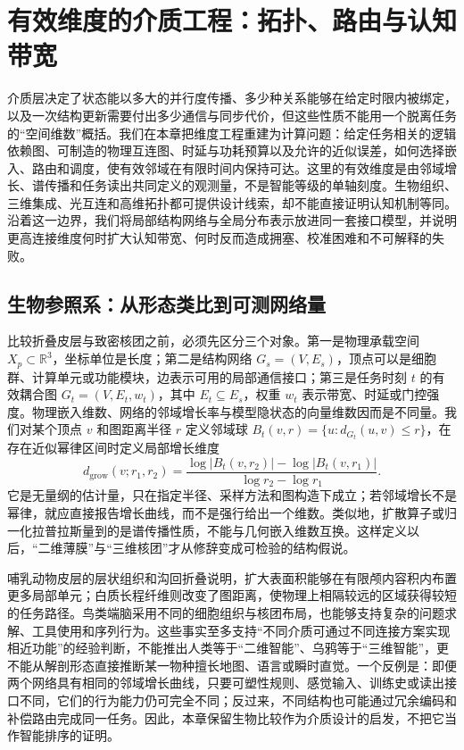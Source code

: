 \chapter{有效维度的介质工程：拓扑、路由与认知带宽}
\label{chp:medium_layer_ch_1}

介质层决定了状态能以多大的并行度传播、多少种关系能够在给定时限内被绑定，以及一次结构更新需要付出多少通信与同步代价，但这些性质不能用一个脱离任务的“空间维数”概括。我们在本章把维度工程重建为计算问题：给定任务相关的逻辑依赖图、可制造的物理互连图、时延与功耗预算以及允许的近似误差，如何选择嵌入、路由和调度，使有效邻域在有限时间内保持可达。这里的有效维度是由邻域增长、谱传播和任务读出共同定义的观测量，不是智能等级的单轴刻度。生物组织、三维集成、光互连和高维拓扑都可提供设计线索，却不能直接证明认知机制等同。沿着这一边界，我们将局部结构网络与全局分布表示放进同一套接口模型，并说明更高连接维度何时扩大认知带宽、何时反而造成拥塞、校准困难和不可解释的失败。

\section{生物参照系：从形态类比到可测网络量}
\label{sec:section_7143}

比较折叠皮层与致密核团之前，必须先区分三个对象。第一是物理承载空间 $X_p\subset\mathbb{R}^3$，坐标单位是长度；第二是结构网络 $G_s=(V,E_s)$，顶点可以是细胞群、计算单元或功能模块，边表示可用的局部通信接口；第三是任务时刻 $t$ 的有效耦合图 $G_t=(V,E_t,w_t)$，其中 $E_t\subseteq E_s$，权重 $w_t$ 表示带宽、时延或门控强度。物理嵌入维数、网络的邻域增长率与模型隐状态的向量维数因而是不同量。我们对某个顶点 $v$ 和图距离半径 $r$ 定义邻域球 $B_t(v,r)=\{u:d_{G_t}(u,v)\le r\}$，在存在近似幂律区间时定义局部增长维度
\[
d_{\mathrm{grow}}(v;r_1,r_2)
=\frac{\log |B_t(v,r_2)|-\log |B_t(v,r_1)|}
{\log r_2-\log r_1}.
\]
它是无量纲的估计量，只在指定半径、采样方法和图构造下成立；若邻域增长不是幂律，就应直接报告增长曲线，而不是强行给出一个维数。类似地，扩散算子或归一化拉普拉斯量到的是谱传播性质，不能与几何嵌入维数互换。这样定义以后，“二维薄膜”与“三维核团”才从修辞变成可检验的结构假说。

哺乳动物皮层的层状组织和沟回折叠说明，扩大表面积能够在有限颅内容积内布置更多局部单元；白质长程纤维则改变了图距离，使物理上相隔较远的区域获得较短的任务路径。鸟类端脑采用不同的细胞组织与核团布局，也能够支持复杂的问题求解、工具使用和序列行为。这些事实至多支持“不同介质可通过不同连接方案实现相近功能”的经验判断，不能推出人类等于“二维智能”、乌鸦等于“三维智能”，更不能从解剖形态直接推断某一物种擅长地图、语言或瞬时直觉。一个反例是：即便两个网络具有相同的邻域增长曲线，只要可塑性规则、感觉输入、训练史或读出接口不同，它们的行为能力仍可完全不同；反过来，不同结构也可能通过冗余编码和补偿路由完成同一任务。因此，本章保留生物比较作为介质设计的启发，不把它当作智能排序的证明。

